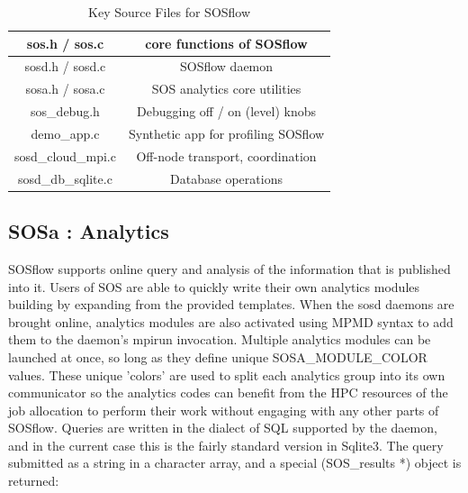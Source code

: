 \begin{table}[!t]
\renewcommand{\arraystretch}{1.3}
\caption{Key Source Files for SOSflow}
\label{tableexample}
\centering
\begin{tabular}{|c|c|}
\hline %
sos.h / sos.c & core functions of SOSflow\\
\hline %
sosd.h / sosd.c & SOSflow daemon\\
\hline %
sosa.h / sosa.c & SOS analytics core utilities\\
\hline %
sos\_debug.h & Debugging off / on (level) knobs\\
\hline %
demo\_app.c & Synthetic app for profiling SOSflow\\
\hline %
sosd\_cloud\_mpi.c & Off-node transport, coordination\\
\hline %
sosd\_db\_sqlite.c & Database operations\\
\hline %
\end{tabular}
\end{table}


\subsection{SOSa : Analytics}

SOSflow supports online query and analysis of the information that is
published into it.
%
Users of SOS are able to quickly write their own analytics modules
building by expanding from the provided templates.
%
When the sosd daemons are brought online, analytics modules are also
activated using MPMD syntax to add them to the daemon's mpirun
invocation.
%
Multiple analytics modules can be launched at once, so long as they
define unique SOSA\_MODULE\_COLOR values.
%
These unique 'colors' are used to split each analytics group into its
own communicator so the analytics codes can benefit from the HPC
resources of the job allocation to perform their work without engaging
with any other parts of SOSflow.
%
Queries are written in the dialect of SQL supported by the daemon, and
in the current case this is the fairly standard version in Sqlite3.
%
The query submitted as a string in a character array, and a special
(SOS\_results *) object is returned:

